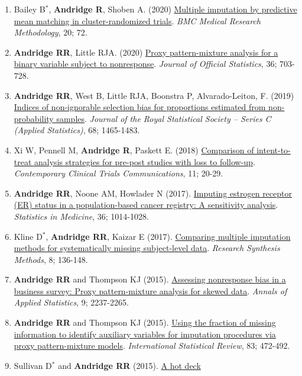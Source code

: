 \documentclass[
  english,
  letterpaper,
  DIV=11,
  numbers=noendperiod]{scrartcl}
\begin{document}
\begin{enumerate}
\item
  Bailey B\(^*\), \textbf{Andridge R}, Shoben A. (2020)
  \href{https://doi.org/10.1186/s12874-020-00948-6}{Multiple imputation
  by predictive mean matching in cluster-randomized trials}. \emph{BMC
  Medical Research Methodology}, 20; 72.
\item
  \textbf{Andridge RR}, Little RJA. (2020)
  \href{https://doi.org/10.2478/jos-2020-0035}{Proxy pattern-mixture
  analysis for a binary variable subject to nonresponse}. \emph{Journal
  of Official Statistics}, 36; 703-728.
\item
  \textbf{Andridge RR}, West B, Little RJA, Boonstra P, Alvarado-Leiton,
  F. (2019) \href{https://doi.org/10.1111/rssc.12371}{Indices of
  non-ignorable selection bias for proportions estimated from
  non-probability samples}. \emph{Journal of the Royal Statistical
  Society -- Series C (Applied Statistics)}, 68; 1465-1483.
\item
  Xi W, Pennell M, \textbf{Andridge R}, Paskett E. (2018)
  \href{https://doi.org/10.1016/j.conctc.2018.05.008}{Comparison of
  intent-to-treat analysis strategies for pre-post studies with loss to
  follow-up}. \emph{Contemporary Clinical Trials Communications}, 11;
  20-29.
\item
  \textbf{Andridge RR}, Noone AM, Howlader N (2017).
  \href{https://doi.org/10.1002/sim.7193}{Imputing estrogen receptor
  (ER) status in a population-based cancer registry: A sensitivity
  analysis}. \emph{Statistics in Medicine}, 36; 1014-1028.
\item
  Kline D\(^*\), \textbf{Andridge RR}, Kaizar E (2017).
  \href{https://doi.org/10.1002/jrsm.1192}{Comparing multiple imputation
  methods for systematically missing subject-level data}. \emph{Research
  Synthesis Methods}, 8; 136-148.
\item
  \textbf{Andridge RR} and Thompson KJ (2015).
  \href{https://doi.org/10.1214/15-AOAS878}{Assessing nonresponse bias
  in a business survey: Proxy pattern-mixture analysis for skewed data}.
  \emph{Annals of Applied Statistics}, 9; 2237-2265.
\item
  \textbf{Andridge RR} and Thompson KJ (2015).
  \href{https://doi.org/10.1111/insr.12091}{Using the fraction of
  missing information to identify auxiliary variables for imputation
  procedures via proxy pattern-mixture models}. \emph{International
  Statistical Review}, 83; 472-492.
\item
  Sullivan D\(^*\) and \textbf{Andridge RR} (2015).
  \href{https://doi.org/10.1016/j.csda.2014.09.008}{A hot deck
}
\end{enumerate}
\end{document}
